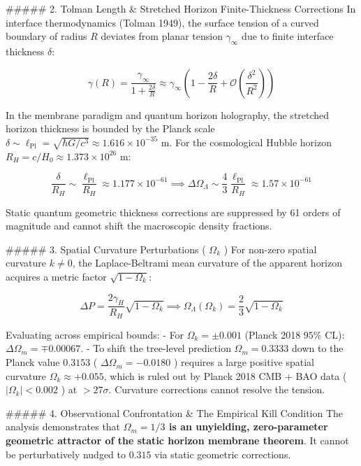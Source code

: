 \documentclass[11pt,a4paper]{article}
\theoremstyle{definition}
\theoremstyle{remark}
\begin{document}
\#\#\#\#\# 2. Tolman Length \& Stretched Horizon Finite-Thickness Corrections
In interface thermodynamics (Tolman 1949), the surface tension of a curved boundary of radius $R$ deviates from planar tension $\gamma_\infty$ due to finite interface thickness $\delta$:


\begin{equation}
\gamma(R) = \frac{\gamma_\infty}{1 + \frac{2\delta}{R}} \approx \gamma_\infty \left(1 - \frac{2\delta}{R} + \mathcal{O}\left(\frac{\delta^2}{R^2}\right)\right)
\end{equation}


In the membrane paradigm and quantum horizon holography, the stretched horizon thickness is bounded by the Planck scale $\delta \sim \ell_{\text{Pl}} = \sqrt{\hbar G / c^3} \approx 1.616 \times 10^{-35}\text{ m}$. For the cosmological Hubble horizon $R_H = c/H_0 \approx 1.373 \times 10^{26}\text{ m}$:


\begin{equation}
\frac{\delta}{R_H} \sim \frac{\ell_{\text{Pl}}}{R_H} \approx 1.177 \times 10^{-61} \implies \Delta\Omega_\Lambda \sim \frac{4}{3}\frac{\ell_{\text{Pl}}}{R_H} \approx 1.57 \times 10^{-61}
\end{equation}


Static quantum geometric thickness corrections are suppressed by 61 orders of magnitude and cannot shift the macroscopic density fractions.

\#\#\#\#\# 3. Spatial Curvature Perturbations ( $\Omega_k$ )
For non-zero spatial curvature $k \neq 0$, the Laplace-Beltrami mean curvature of the apparent horizon acquires a metric factor $\sqrt{1 - \Omega_k}$:


\begin{equation}
\Delta P = \frac{2\gamma_H}{R_H}\sqrt{1 - \Omega_k} \implies \Omega_\Lambda(\Omega_k) = \frac{2}{3}\sqrt{1 - \Omega_k}
\end{equation}


Evaluating across empirical bounds:
- For $\Omega_k = \pm 0.001$ (Planck 2018 $95\%$ CL): $\Delta\Omega_m = \mp 0.00067$.
- To shift the tree-level prediction $\Omega_m = 0.3333$ down to the Planck value $0.3153$ ( $\Delta\Omega_m = -0.0180$ ) requires a large positive spatial curvature $\Omega_k \approx +0.055$, which is ruled out by Planck 2018 CMB + BAO data ( $|\Omega_k| < 0.002$ ) at $> 27\sigma$. Curvature corrections cannot resolve the tension.

\#\#\#\#\# 4. Observational Confrontation \& The Empirical Kill Condition
The analysis demonstrates that \textbf{$\Omega_m = 1/3$ is an unyielding, zero-parameter geometric attractor of the static horizon membrane theorem}. It cannot be perturbatively nudged to $0.315$ via static geometric corrections.
\end{document}
